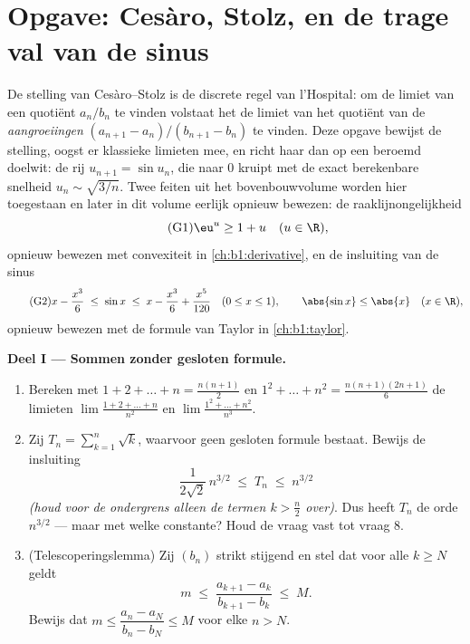 \section{Opgave: Cesàro, Stolz, en de trage val van de sinus}

\begin{problem}[{Weekendopgave --- de stelling van Cesàro--Stolz en de
asymptotiek $u_n \sim \sqrt{3/n}$ voor $u_{n+1} = \sin u_n$}]
\label{pb:b1:seq:1}
De stelling van Cesàro--Stolz is de discrete regel van l'Hospital: om de
limiet van een quotiënt $a_n/b_n$ te vinden volstaat het de limiet van het
quotiënt van de \emph{aangroeiingen} $(a_{n+1} - a_n)/(b_{n+1} - b_n)$ te
vinden. Deze opgave bewijst de stelling, oogst er klassieke limieten mee,
en richt haar dan op een beroemd doelwit: de rij $u_{n+1} = \sin u_n$,
die naar $0$ kruipt met de exact berekenbare snelheid $u_n \sim
\sqrt{3/n}$. Twee feiten uit het
bovenbouwvolume worden hier toegestaan en later in dit volume eerlijk
opnieuw bewezen: de raaklijnongelijkheid
\[
\tag{G1} \eu^{u} \geq 1 + u \quad (u \in \R),
\]
opnieuw bewezen met convexiteit in \cref{ch:b1:derivative}, en de
insluiting van de sinus
\[
\tag{G2} x - \frac{x^3}{6} \;\leq\; \sin x \;\leq\; x -
\frac{x^3}{6} + \frac{x^5}{120} \quad (0 \leq x \leq 1), \qquad
\abs{\sin x} \leq \abs{x} \quad (x \in \R),
\]
opnieuw bewezen met de formule van Taylor in \cref{ch:b1:taylor}.

\medskip
\noindent\textbf{Deel I --- Sommen zonder gesloten formule.}
\begin{enumerate}
  \item Bereken met $1 + 2 + \dots + n = \frac{n(n+1)}{2}$ en $1^2 +
        \dots + n^2 = \frac{n(n+1)(2n+1)}{6}$ de limieten $\lim \frac{1
        + 2 + \dots + n}{n^2}$ en $\lim \frac{1^2 + \dots + n^2}{n^3}$.
  \item Zij $T_n = \sum_{k=1}^n \sqrt k$, waarvoor geen gesloten formule
        bestaat. Bewijs de insluiting
        \[
        \frac{1}{2\sqrt 2}\,n^{3/2} \;\leq\; T_n \;\leq\;
        n^{3/2}
        \]
        \emph{(houd voor de ondergrens alleen de termen $k > \frac n2$
        over)}. Dus heeft $T_n$ de orde $n^{3/2}$ --- maar met welke
        constante? Houd de vraag vast tot vraag 8.
  \item (Telescoperingslemma) Zij $(b_n)$ strikt stijgend en stel dat
        voor alle $k \geq N$ geldt
        \[
        m \;\leq\; \frac{a_{k+1} - a_k}{b_{k+1} - b_k} \;\leq\;
        M .
        \]
        Bewijs dat $m \leq \dfrac{a_n - a_N}{b_n - b_N} \leq M$ voor
        elke $n > N$.
\end{enumerate}


\end{problem}
